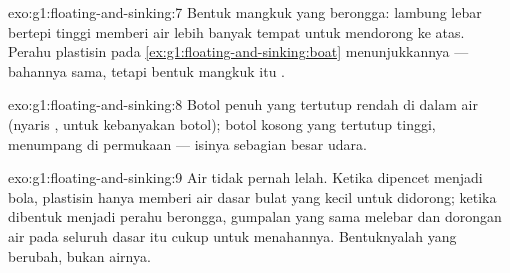 \begin{solution}{exo:g1:floating-and-sinking:7}
Bentuk mangkuk yang berongga: lambung lebar bertepi tinggi memberi air
lebih banyak tempat untuk mendorong ke atas. Perahu plastisin pada
\cref{ex:g1:floating-and-sinking:boat} menunjukkannya --- bahannya
sama, tetapi bentuk mangkuk itu .
\end{solution}

\begin{solution}{exo:g1:floating-and-sinking:8}
Botol penuh yang tertutup  rendah di dalam air (nyaris
, untuk kebanyakan botol); botol kosong yang tertutup
 tinggi, menumpang di permukaan --- isinya sebagian besar
udara.
\end{solution}

\begin{solution}{exo:g1:floating-and-sinking:9}
Air tidak pernah lelah. Ketika dipencet menjadi bola, plastisin hanya
memberi air dasar bulat yang kecil untuk didorong; ketika dibentuk
menjadi perahu berongga, gumpalan yang sama melebar dan dorongan air
pada seluruh dasar itu cukup untuk menahannya. Bentuknyalah yang
berubah, bukan airnya.
\end{solution}
